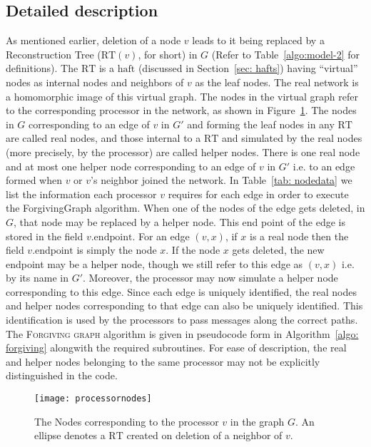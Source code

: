 \documentclass[11pt, letter]{article}
\newcommand{\RT}{\mathrm{RT}}
\newcommand{\Endpoint}{\mathrm{endpoint}}
\newcommand{\haft}{\mathrm{haft}}
\begin{document}
\subsection{Detailed description} 
As mentioned earlier, deletion of  a node $v$ leads to it being replaced by  a Reconstruction Tree ($\RT(v)$, for short)
in $G$ (Refer to Table~\ref{algo:model-2} for definitions). The $\RT$ is a  $\haft$ (discussed in  Section~\ref{sec:
hafts}) having ``virtual'' nodes as internal nodes  and neighbors of $v$ as the leaf nodes. 
The real network is a homomorphic image of  this virtual graph. The nodes in the virtual graph refer to the
corresponding processor in the network, as shown in Figure~\ref{fig: processornodes}.  The nodes in $G$ corresponding to
an edge of $v$ in $G'$ and forming the leaf nodes in any $\RT$ are called real nodes, and those internal to a $\RT$
and simulated by the real nodes (more precisely, by the processor) are called helper nodes. There is one real node and
at most one helper node corresponding to an edge of $v$ in $G'$ i.e. to an edge formed when $v$ or $v$'s neighbor
joined the network.   In Table~\ref{tab: nodedata} we list the information each processor $v$ requires for each edge in
order to execute the ForgivingGraph algorithm. When one of the nodes of the edge gets deleted, in $G$, that node may be
replaced by a helper node.  This end point of the edge is stored in the field  $v.\Endpoint$. For an edge $(v,x)$, if $x$ is a real
node then the field $v.\Endpoint$ is simply the node $x$. If the node $x$ gets deleted, the new endpoint may be a helper
node, though we  still refer to this edge as $(v,x)$ i.e. by its name in $G'$. Moreover, the processor may now simulate
a helper node corresponding to this edge. Since each edge is uniquely identified, the real nodes and helper nodes
corresponding to that edge can also be uniquely identified. This identification is used by the processors to pass
messages along the correct paths. The \textsc{Forgiving graph} algorithm is given in pseudocode form in Algorithm~\ref{algo: forgiving}
alongwith the required subroutines. For ease of description, the real and helper nodes belonging to the same processor
may not be explicitly distinguished in the code.

\begin{figure}[h!]
\centering
\texttt{[image: processornodes]}
\caption{The Nodes corresponding to the processor $v$ in the graph $G$. An ellipse denotes a $\RT$ created on deletion of a
neighbor of $v$.}
\label{fig: processornodes}
\end{figure}
\end{document}
